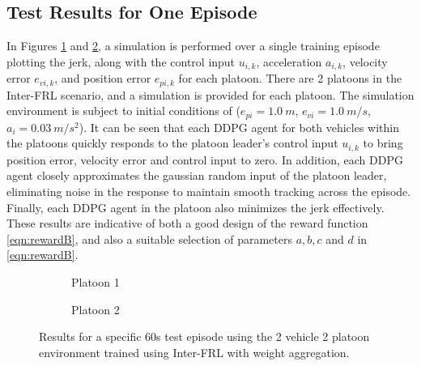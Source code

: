 \subsection{Test Results for One Episode}
In Figures \ref{fig:simresINTERFRLWA_p1} and \ref{fig:simresINTERFRLWA_p2}, a simulation is
performed over a single training episode plotting the jerk, along with the control
input $u_{i,k}$, acceleration $a_{i,k}$, velocity error $e_{vi,k}$, and position
error $e_{pi,k}$ for each platoon.  There are 2 platoons in the Inter-FRL scenario,
and a simulation is provided for each platoon. The simulation environment is subject
to initial conditions of ($e_{pi} = 1.0\:m$, $e_{vi}=1.0\:m/s$, $a_i = 0.03\:m/s^2$).
It can be seen that each DDPG agent for both vehicles within the platoons quickly
responds to the platoon leader's control input $u_{i,k}$ to bring position error,
velocity error and control input to zero.  In addition, each DDPG agent closely
approximates the gaussian random input of the platoon leader, eliminating noise in
the response to maintain smooth tracking across the episode. Finally, each DDPG agent
in the platoon also minimizes the jerk effectively. These results are indicative of
both a good design of the reward function \eqref{eqn:rewardB}, and also a suitable
selection of parameters $a, b, c$ and $d$ in \eqref{eqn:rewardB}.

\begin{figure}[H]
\centering
    \begin{subfigure}{0.45\textwidth}
        \centering
        
       \caption{Platoon 1}\label{fig:simresINTERFRLWA_p1}
    \end{subfigure}\hspace{\interfrlRewSpace}
    \begin{subfigure}{0.45\textwidth}
        \centering
        
       \caption{Platoon 2}\label{fig:simresINTERFRLWA_p2}
    \end{subfigure}
\label{fig:interfrlsim}
\caption{Results for a specific 60s test episode using the 2 vehicle 2 platoon environment
trained using Inter-FRL with weight aggregation.}
\end{figure}

